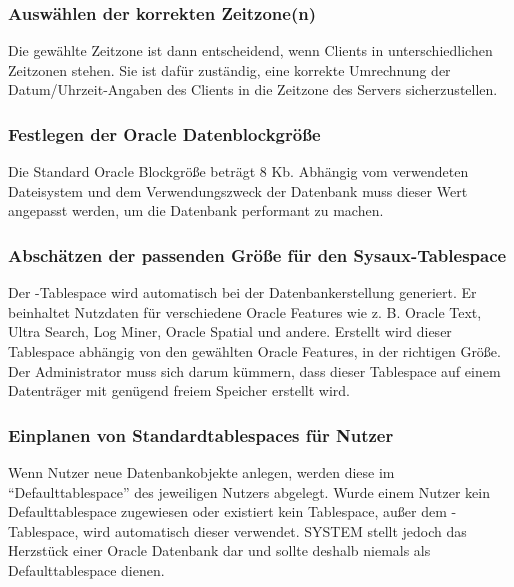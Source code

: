           \begin{literaturinternet}
            \item \cite{NLSPG002}
          \end{literaturinternet}

        \subsubsection{Auswählen der korrekten Zeitzone(n)}
          Die gewählte Zeitzone ist dann entscheidend, wenn Clients in unterschiedlichen Zeitzonen stehen. Sie ist dafür zuständig, eine korrekte Umrechnung der Datum/Uhrzeit-Angaben des Clients in die Zeitzone des Servers sicherzustellen.

          \begin{literaturinternet}
            \item \cite{i1006705}
          \end{literaturinternet}

        \subsubsection{Festlegen der Oracle Datenblockgröße}
          Die Standard Oracle Blockgröße beträgt 8 Kb. Abhängig vom verwendeten Dateisystem und dem Verwendungszweck der Datenbank muss dieser Wert angepasst werden, um die Datenbank performant zu machen.
        \subsubsection{Abschätzen der passenden Größe für den Sysaux-Tablespace}
          Der -Tablespace wird automatisch bei der Datenbankerstellung generiert. Er beinhaltet Nutzdaten für verschiedene Oracle Features wie z. B. Oracle Text, Ultra Search, Log Miner, Oracle Spatial und andere. Erstellt wird dieser Tablespace abhängig von den gewählten Oracle Features, in der richtigen Größe. Der Administrator muss sich darum kümmern, dass dieser Tablespace auf einem Datenträger mit genügend freiem Speicher erstellt wird.
        \subsubsection{Einplanen von Standardtablespaces für Nutzer}
          Wenn Nutzer neue Datenbankobjekte anlegen, werden diese im \enquote{Defaulttablespace} des jeweiligen Nutzers abgelegt. Wurde einem Nutzer kein Defaulttablespace zugewiesen oder existiert kein Tablespace, außer dem -Tablespace, wird automatisch dieser verwendet. SYSTEM stellt jedoch das Herzstück einer Oracle Datenbank dar und sollte deshalb niemals als Defaulttablespace dienen.

